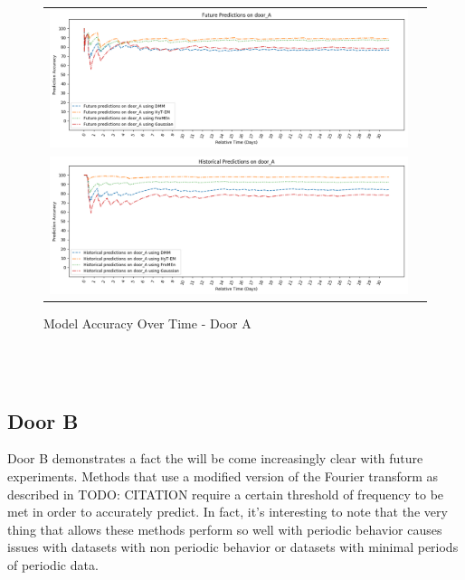 \begin{center}
\begin{figure}[!Hp]
  \begin{tabular}{cc}
    {\includegraphics[width = 6in]{images/results/Future_Predictions_on_door_A.png}} \\
    {\includegraphics[width = 6in]{images/results/Historical_Predictions_on_door_A.png}} \\
  \end{tabular}
  \caption{Model Accuracy Over Time - Door A}
  \label{figure:accuracy_door_A}
\end{figure} \\ \\
\end{center}

\subsection { Door B }

Door B demonstrates a fact the will be come increasingly clear with future
experiments.  Methods that use a modified version of the Fourier transform as
described in TODO: CITATION require a certain threshold of frequency to be met
in order to accurately predict.  In fact, it's interesting to note that the
very thing that allows these methods perform so well with periodic behavior
causes issues with datasets with non periodic behavior or datasets with
minimal periods of periodic data. \\

